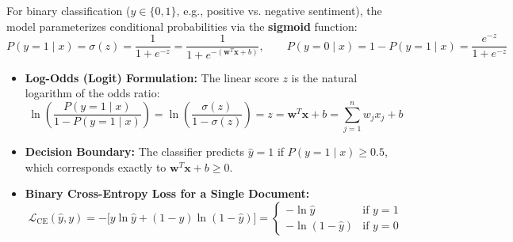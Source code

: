 \documentclass[10pt,a4paper]{article}
\begin{document}
\par\vspace{1pt}
For binary classification ($y \in \{0, 1\}$, e.g., positive vs. negative sentiment), the model parameterizes conditional probabilities via the \textbf{sigmoid} function:
\[
P(y = 1 \mid x) = \sigma(z) = \frac{1}{1 + e^{-z}} = \frac{1}{1 + e^{-(\mathbf{w}^T \mathbf{x} + b)}}, \qquad P(y = 0 \mid x) = 1 - P(y = 1 \mid x) = \frac{e^{-z}}{1 + e^{-z}}
\]
\begin{itemize}[leftmargin=12pt, itemsep=0.5pt, parsep=0pt, topsep=0.5pt]
    \item \textbf{Log-Odds (Logit) Formulation:} The linear score $z$ is the natural logarithm of the odds ratio:
    \[
    \ln\left( \frac{P(y = 1 \mid x)}{1 - P(y = 1 \mid x)} \right) = \ln\left( \frac{\sigma(z)}{1 - \sigma(z)} \right) = z = \mathbf{w}^T \mathbf{x} + b = \sum_{j=1}^n w_j x_j + b
    \]
    \item \textbf{Decision Boundary:} The classifier predicts $\hat{y} = 1$ if $P(y = 1 \mid x) \ge 0.5$, which corresponds exactly to $\mathbf{w}^T \mathbf{x} + b \ge 0$.
    \item \textbf{Binary Cross-Entropy Loss for a Single Document:}
    \[
    \mathcal{L}_{\text{CE}}(\hat{y}, y) = -\big[ y \ln \hat{y} + (1 - y) \ln(1 - \hat{y}) \big] = \begin{cases} -\ln \hat{y} & \text{if } y = 1 \\ -\ln(1 - \hat{y}) & \text{if } y = 0 \end{cases}
    \]
\end{itemize}
\vspace{2pt}
\end{document}
